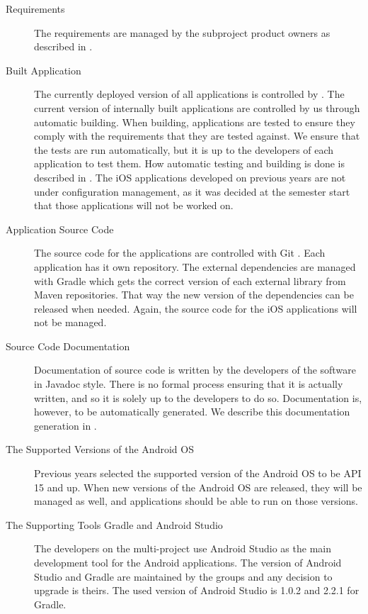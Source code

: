 \begin{description}
  \item[Requirements] The requirements are managed by the subproject product owners as described in .
  \item[Built Application] The currently deployed version of all applications is controlled by . The current version of internally built applications are controlled by us through automatic building. When building, applications are tested to ensure they comply with the requirements that they are tested against. We ensure that the tests are run automatically, but it is up to the developers of each application to test them. How automatic testing and building is done is described in  . The iOS applications developed on previous years are not under configuration management, as it was decided at the semester start that those applications will not be worked on.
  \item[Application Source Code] The source code for the applications are controlled with Git \parencite{gitwebsite}. Each application has it own repository. The external dependencies are managed with Gradle which gets the correct version of each external library from Maven repositories. That way the new version of the dependencies can be released when needed. Again, the source code for the iOS applications will not be managed.
  \item[Source Code Documentation] Documentation of source code is written by the developers of the software in Javadoc style. There is no formal process ensuring that it is actually written, and so it is solely up to the developers to do so. Documentation is, however, to be automatically generated. We describe this documentation generation in  .
  \item[The Supported Versions of the Android OS] Previous years selected the supported version of the Android OS to be API 15 and up. When new versions of the Android OS are released, they will be managed as well, and applications should be able to run on those versions.
  \item[The Supporting Tools Gradle and Android Studio] The developers on the multi-project use Android Studio as the main development tool for the Android applications. The version of Android Studio and Gradle are maintained by the \bd groups and any decision to upgrade is theirs. The used version of Android Studio is 1.0.2 and 2.2.1 for Gradle.
\end{description}

